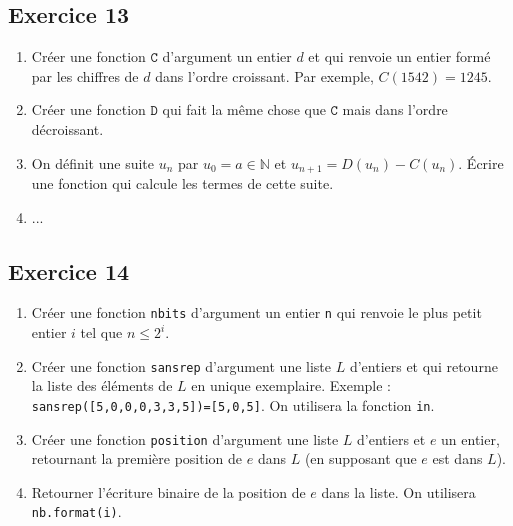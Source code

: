 \documentclass[10pt,fleqn]{article} %
\begin{document}
\begin{multicols}{2}
\subsection*{Exercice 13}
\begin{enumerate}
\item Créer une fonction $\texttt{C}$ d'argument un entier $d$ et qui renvoie un entier formé par les chiffres de $d$ dans l'ordre croissant. Par exemple, $C(1542)=1245$.
\item Créer une fonction $\texttt{D}$ qui fait la même chose que $\texttt{C}$ mais dans l'ordre décroissant. 
\item On définit une suite $u_n$ par $u_0=a \in \mathbb{N}$ et $u_{n+1}=D(u_n)-C(u_n)$. Écrire une fonction qui calcule les termes de cette suite.
\item ...
\end{enumerate}

\subsection*{Exercice 14}
\begin{enumerate}
\item Créer une fonction \texttt{nbits} d'argument un entier \texttt{n} qui renvoie le plus petit entier $i$ tel que $n \leq 2^i$. 
\item Créer une fonction \texttt{sansrep} d'argument une liste $L$ d'entiers et qui retourne la liste des éléments de $L$ en unique exemplaire. Exemple : \texttt{sansrep([5,0,0,0,3,3,5])=[5,0,5]}. On utilisera la fonction \texttt{in}.
\item Créer une fonction \texttt{position} d'argument une liste $L$ d'entiers et $e$ un entier, retournant la première position de $e$ dans $L$ (en supposant que $e$ est dans $L$).
\item Retourner l'écriture binaire de la position de $e$ dans la liste. On utilisera \texttt{nb.format(i)}.

\end{enumerate}


\end{multicols}
\end{document}
